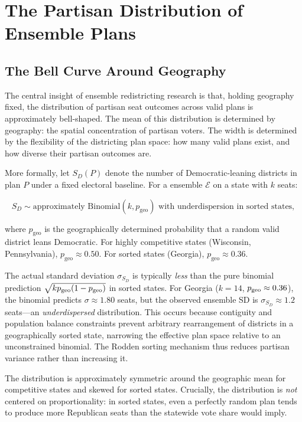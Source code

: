 \section{The Partisan Distribution of Ensemble Plans}
\label{sec:bell-curve}

\subsection{The Bell Curve Around Geography}

The central insight of ensemble redistricting research is that, holding
geography fixed, the distribution of partisan seat outcomes across valid plans
is approximately bell-shaped.  The mean of this distribution is determined
by geography: the spatial concentration of partisan voters.  The width is
determined by the flexibility of the districting plan space: how many valid
plans exist, and how diverse their partisan outcomes are.

More formally, let $S_D(P)$ denote the number of Democratic-leaning districts
in plan $P$ under a fixed electoral baseline.  For a \recom{} ensemble
$\mathcal{E}$ on a state with $k$ seats:

\begin{equation}
  S_D \sim \text{approximately } \mathrm{Binomial}(k, p_{\text{geo}})
  \text{ with underdispersion in sorted states},
  \label{eq:partisan-dist}
\end{equation}

where $p_{\text{geo}}$ is the geographically determined probability that
a random valid district leans Democratic.  For highly competitive states
(Wisconsin, Pennsylvania), $p_{\text{geo}} \approx 0.50$.  For sorted
states (Georgia), $p_{\text{geo}} \approx 0.36$.

The actual standard deviation $\sigma_{S_D}$ is typically \emph{less} than
the pure binomial prediction $\sqrt{k p_{\rm geo}(1-p_{\rm geo})}$ in sorted
states.  For Georgia ($k=14$, $p_{\rm geo} \approx 0.36$), the binomial
predicts $\sigma \approx 1.80$ seats, but the observed ensemble SD is
$\sigma_{S_D} \approx 1.2$ seats---an \emph{underdispersed} distribution.
This occurs because contiguity and population balance constraints prevent
arbitrary rearrangement of districts in a geographically sorted state,
narrowing the effective plan space relative to an unconstrained binomial.
The Rodden sorting mechanism thus reduces partisan variance rather than
increasing it.

The distribution is approximately symmetric around the geographic mean for
competitive states and skewed for sorted states.  Crucially, the distribution
is \emph{not} centered on proportionality: in sorted states, even a perfectly
random plan tends to produce more Republican seats than the statewide vote
share would imply.

